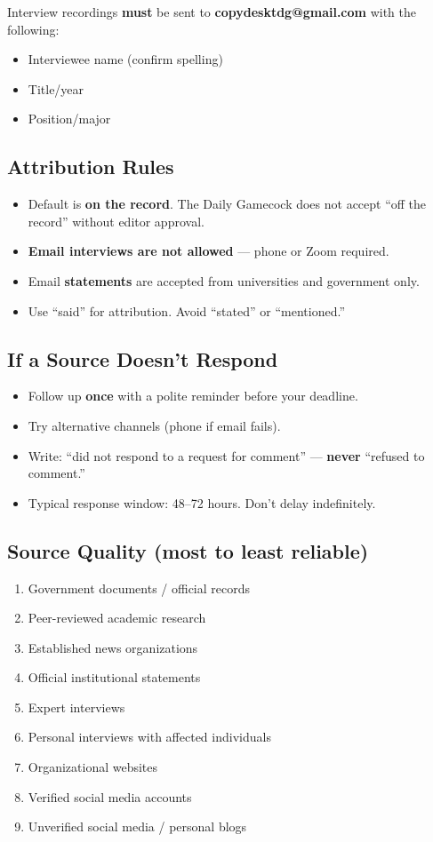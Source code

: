 \documentclass[12pt]{article}
\begin{document}
Interview recordings \textbf{must} be sent to \textbf{copydesktdg@gmail.com} with the following:
\begin{itemize}
    \item Interviewee name (confirm spelling)
    \item Title/year
    \item Position/major
\end{itemize}

\subsection{Attribution Rules}

\begin{itemize}
    \item Default is \textbf{on the record}. The Daily Gamecock does not accept ``off the record'' without editor approval.
    \item \textbf{Email interviews are not allowed} --- phone or Zoom required.
    \item Email \textbf{statements} are accepted from universities and government only.
    \item Use ``said'' for attribution. Avoid ``stated'' or ``mentioned.''
\end{itemize}

\subsection{If a Source Doesn't Respond}

\begin{itemize}
    \item Follow up \textbf{once} with a polite reminder before your deadline.
    \item Try alternative channels (phone if email fails).
    \item Write: ``did not respond to a request for comment'' --- \textbf{never} ``refused to comment.''
    \item Typical response window: 48--72 hours. Don't delay indefinitely.
\end{itemize}

\subsection{Source Quality (most to least reliable)}

\begin{enumerate}
    \item Government documents / official records
    \item Peer-reviewed academic research
    \item Established news organizations
    \item Official institutional statements
    \item Expert interviews
    \item Personal interviews with affected individuals
    \item Organizational websites
    \item Verified social media accounts
    \item Unverified social media / personal blogs
\end{enumerate}
\end{document}
